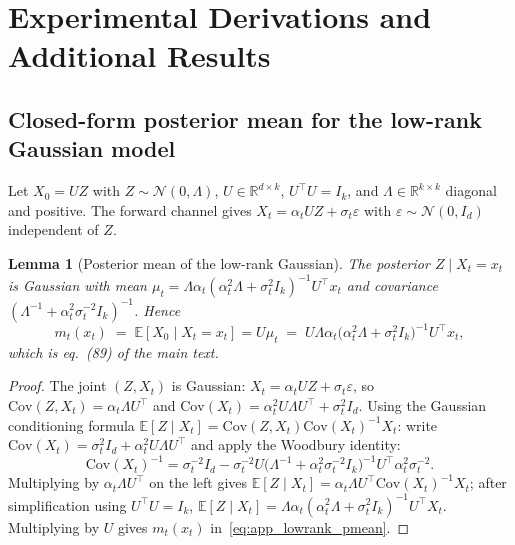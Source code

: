 \documentclass{article}
\theoremstyle{plain}
\newtheorem{lemma}[theorem]{Lemma}
\theoremstyle{definition}
\theoremstyle{remark}
\begin{document}
\section{Experimental Derivations and Additional Results}
\label{app:exp_details}

\subsection{Closed-form posterior mean for the low-rank Gaussian model}

Let \(X_0 = UZ\) with \(Z\sim\mathcal{N}(0,\Lambda)\), \(U\in\mathbb{R}^{d\times k}\),
\(U^\top U = I_k\), and \(\Lambda\in\mathbb{R}^{k\times k}\) diagonal and
positive. The forward channel gives \(X_t = \alpha_t UZ + \sigma_t\varepsilon\)
with \(\varepsilon\sim\mathcal{N}(0,I_d)\) independent of \(Z\).

\begin{lemma}[Posterior mean of the low-rank Gaussian]
\label{lem:lowrank_posterior}
The posterior \(Z \mid X_t = x_t\) is Gaussian with mean
\(\mu_t = \Lambda\alpha_t(\alpha_t^2\Lambda + \sigma_t^2 I_k)^{-1}U^\top x_t\)
and covariance \((\Lambda^{-1} + \alpha_t^2\sigma_t^{-2}I_k)^{-1}\). Hence
\begin{equation}
m_t(x_t) \;=\; \mathbb{E}[X_0\mid X_t = x_t] = U\mu_t
\;=\; U\Lambda\alpha_t\bigl(\alpha_t^2\Lambda + \sigma_t^2 I_k\bigr)^{-1} U^\top x_t,
\label{eq:app_lowrank_pmean}
\end{equation}
which is eq.~(89) of the main text.
\end{lemma}

\begin{proof}
The joint \((Z, X_t)\) is Gaussian:
\(X_t = \alpha_t UZ + \sigma_t\varepsilon\), so
\(\mathrm{Cov}(Z, X_t) = \alpha_t\Lambda U^\top\) and
\(\mathrm{Cov}(X_t) = \alpha_t^2 U\Lambda U^\top + \sigma_t^2 I_d\). Using
the Gaussian conditioning formula
\(\mathbb{E}[Z\mid X_t] = \mathrm{Cov}(Z,X_t)\mathrm{Cov}(X_t)^{-1}X_t\):
write \(\mathrm{Cov}(X_t) = \sigma_t^2 I_d + \alpha_t^2 U\Lambda U^\top\) and
apply the Woodbury identity:
\begin{equation*}
\mathrm{Cov}(X_t)^{-1} = \sigma_t^{-2}I_d -
  \sigma_t^{-2}U\bigl(\Lambda^{-1} + \alpha_t^2\sigma_t^{-2}I_k\bigr)^{-1}U^\top \alpha_t^2\sigma_t^{-2}.
\end{equation*}
Multiplying by \(\alpha_t\Lambda U^\top\) on the left gives
\(\mathbb{E}[Z\mid X_t] = \alpha_t\Lambda U^\top\mathrm{Cov}(X_t)^{-1}X_t\);
after simplification using \(U^\top U = I_k\),
\(\mathbb{E}[Z\mid X_t] = \Lambda\alpha_t(\alpha_t^2\Lambda +
\sigma_t^2 I_k)^{-1}U^\top X_t\). Multiplying by \(U\) gives
\(m_t(x_t)\) in~\eqref{eq:app_lowrank_pmean}.
\end{proof}
\end{document}
